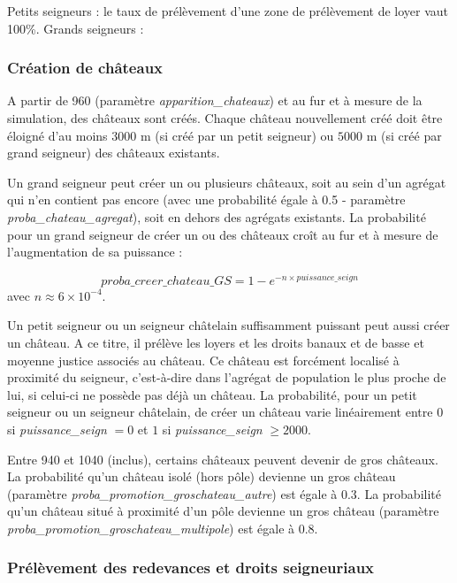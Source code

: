 \documentclass[a4paper,11pt]{article}
\begin{document}
{Petits seigneurs : le taux de prélèvement d'une zone de prélèvement de loyer vaut 100\%.
Grands seigneurs : 

\subsubsection{Création de châteaux}

A partir de 960 (paramètre \textit{apparition\_chateaux}) et au fur et à mesure de la simulation, des châteaux sont créés. Chaque château nouvellement créé doit être éloigné d'au moins $3000$ m (si créé par un petit seigneur) ou $5000$ m (si créé par grand seigneur) des châteaux existants.

\bigskip
Un grand seigneur peut créer un ou plusieurs châteaux, soit au sein d'un agrégat qui n'en contient pas encore (avec une probabilité égale à 0.5 - paramètre \textit{proba\_chateau\_agregat}), soit en dehors des agrégats existants. La probabilité pour un grand seigneur de créer un ou des châteaux croît au fur et à mesure de l'augmentation de sa puissance : 

\begin{equation}
proba\_creer\_chateau\_GS = 1 - e^{-n \times puissance\_seign}
\end{equation}
avec $n \approx 6 \times 10^{-4}$.

\bigskip
Un petit seigneur ou un seigneur châtelain suffisamment puissant peut aussi créer un château. A ce titre, il prélève les loyers et les droits banaux et de basse et moyenne justice associés au château. Ce château est forcément localisé à proximité du seigneur, c'est-à-dire dans l'agrégat de population le plus proche de lui, si celui-ci ne possède pas déjà un château. La probabilité, pour un petit seigneur ou un seigneur châtelain, de créer un château varie linéairement entre $0$ si \textit{puissance\_seign} $= 0$
et $1$ si \textit{puissance\_seign} $≥ 2000$.

\bigskip
Entre 940 et 1040 (inclus), certains châteaux peuvent devenir de gros châteaux. La probabilité qu'un château isolé (hors pôle) devienne un gros château (paramètre \textit{proba\_promotion\_groschateau\_autre}) est égale à 0.3. La probabilité qu'un château situé à proximité d'un pôle devienne un gros château (paramètre \textit{proba\_promotion\_groschateau\_multipole}) est égale à 0.8.

\subsubsection{Prélèvement des redevances et droits seigneuriaux}

}
\end{document}
